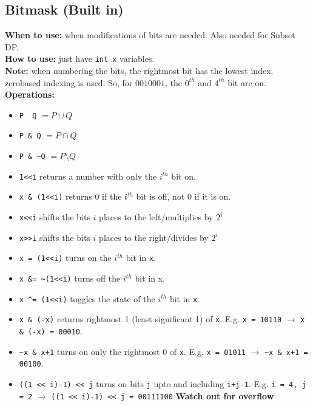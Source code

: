 \documentclass[a4paper,10pt]{article}
\begin{document}
\begin{multicols}{2}
\subsection{Bitmask (Built in)}\label{sec:bitmask}
\textbf{When to use:} when modifications of bits are needed. Also needed for Subset DP.\\
\textbf{How to use:} just have \lstinline|int x| variables.\\
\textbf{Note:} when numbering the bits, the rightmost bit has the lowest index. zerobased indexing is used. So, for $0010001$, the $0^{th}$ and $4^{th}$ bit are on.\\
\textbf{Operations:}
\begin{itemize}[nolistsep,noitemsep]
\itemsep0em
\item \lstinline|P |\textbar\lstinline| Q| $= P\cup Q$
\item \lstinline|P & Q| $= P\cap Q$
\item \lstinline|P & ~Q| $= P\setminus Q$
\item \lstinline|1<<i| returns a number with only the $i^{th}$ bit on.
\item \lstinline|x & (1<<i)| returns 0 if the $i^{th}$ bit is off, not 0 if it is on.
\item \lstinline|x<<i| shifts the bits $i$ places to the left/multiplies by $2^i$
\item \lstinline|x>>i| shifts the bits $i$ places to the right/divides by $2^i$
\item \lstinline|x |\textbar\lstinline|= (1<<i)| turns on the $i^{th}$ bit in \lstinline|x|.
\item \lstinline|x &= ~(1<<i)| turns off the $i^{th}$ bit in x.
\item \lstinline|x ^= (1<<i)| toggles the state of the $i^{th}$ bit in \lstinline|x|.
\item \lstinline|x & (-x)| returns rightmost 1 (least significant 1) of \lstinline|x|. E.g. \lstinline|x = 10110| $\rightarrow$ \lstinline|x & (-x) = 00010|.
\item \lstinline|~x & x+1| turns on only the rightmost 0 of \lstinline|x|. E.g. \lstinline|x = 01011| $\rightarrow$ \lstinline|~x & x+1 = 00100|.
\item \lstinline|((1 << i)-1) << j| turns on bits \lstinline|j| upto and including \lstinline|i+j-1|. E.g. \lstinline|i = 4, j = 2| $\rightarrow$  
\lstinline|((1 << i)-1) << j = 00111100| \textbf{Watch out for overflow}
\end{itemize}


\end{multicols}
\end{document}
